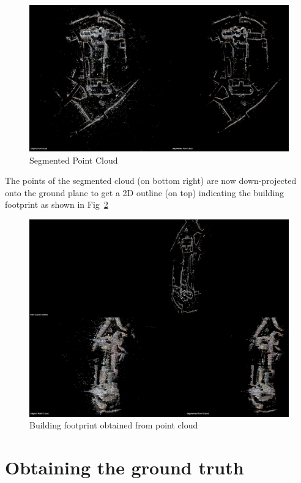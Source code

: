 \documentclass[10pt,twocolumn,letterpaper]{article}
\begin{document}
\begin{figure}[h]
   \centering
   \includegraphics[width=\linewidth]{images/pcl_segmentation.png}
   \caption{Segmented Point Cloud}
   \label{fig:seg_cloud}
\end{figure}

The points of the segmented cloud (on bottom right) are now down-projected onto the ground plane to get a 2D outline (on top) indicating the building footprint as shown in Fig~\ref{fig:pcl_outline}

\begin{figure}[h]
   \centering
   \includegraphics[width=\linewidth]{images/pcl_outline.png}
   \caption{Building footprint obtained from point cloud}
   \label{fig:pcl_outline}
\end{figure}

\section{Obtaining the ground truth}
\end{document}

